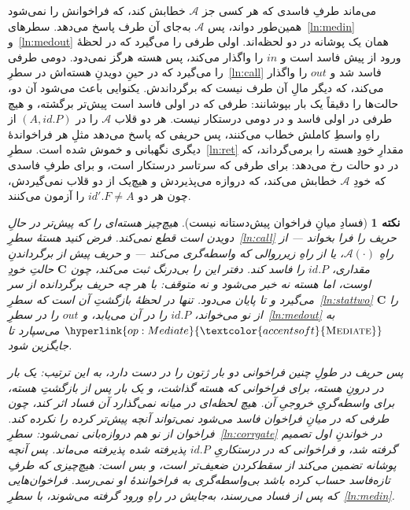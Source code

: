 \documentclass[10pt,oneside,openany]{book}
\newcommand{\Cs}{\mathbf{C}}
\newcommand{\Adv}{\mathcal{A}}
\newcommand{\op}[1]{\textnormal{\textsc{#1}}}
\newcommand{\opl}[1]{\hyperlink{op:#1}{\textcolor{accentsoft}{\op{#1}}}}
\newcommand{\id}{id}
\theoremstyle{accentdef}
\newtheorem{remark}[definition]{نکته}
\theoremstyle{accentplain}
\begin{document}
می‌ماند طرفِ فاسدی که هر کسی جز $\Adv$ خطابش کند، که فراخوانش را نمی‌شود
همین‌طور دواند، پس $\Adv$ به‌جای آن طرف پاسخ می‌دهد.
سطرهای~\ref{ln:medin} و~\ref{ln:medout} همان یک پوشانه در دو لحظه‌اند.
اولی طرفی را می‌گیرد که در لحظهٔ ورود از پیش فاسد است و $in$ را واگذار
می‌کند، پس هسته هرگز نمی‌دود. دومی طرفی را می‌گیرد که در حینِ دویدنِ
هسته‌اش در سطرِ~\ref{ln:call} فاسد شد و $out$ را واگذار می‌کند، که دیگر
مالِ آن طرف نیست که برگرداندش. یکنوایی باعث می‌شود آن دو، حالت‌ها را
دقیقاً یک بار بپوشانند: طرفی که در اولی فاسد است پیش‌تر برگشته، و هیچ طرفی
در اولی فاسد و در دومی درستکار نیست. هر دو قلاب $\Adv$ را در $(A,\id.P)$
از راهِ واسطِ کاملش خطاب می‌کنند، پس حریفی که پاسخ می‌دهد مثلِ هر
فراخواندهٔ دیگری نگهبانی و خموش شده است. سطرِ~\ref{ln:ret} مقدارِ خودِ
هسته را برمی‌گرداند، که در دو حالت رخ می‌دهد: برای طرفی که سرتاسر درستکار
است، و برای طرفِ فاسدی که خودِ $\Adv$ خطابش می‌کند، که دروازه می‌پذیردش و
هیچ‌یک از دو قلاب نمی‌گیردش، چون هر دو $\id'.F \neq A$ را آزمون می‌کنند.

\begin{remark}[فسادِ میانِ فراخوان پیش‌دستانه نیست]\label{rem:midcall}
هیچ‌چیز هسته‌ای را که پیش‌تر در حالِ دویدن است قطع نمی‌کند. فرض کنید
هستهٔ سطرِ~\ref{ln:call} حریف را فرا بخواند --- از راهِ $\Adv(\cdot)$، یا
از راهِ زیرروالی که واسطه‌گری می‌کند --- و حریف پیش از برگرداندنِ مقداری،
$\id.P$ را فاسد کند. دفتر این را بی‌درنگ ثبت می‌کند، چون $\Cs$ حالتِ خودِ
اوست، اما هسته نه خبر می‌شود و نه متوقف: با هر چه حریف برگردانده از سر
می‌گیرد و تا پایان می‌دود. تنها در لحظهٔ بازگشتِ آن است که
سطرِ~\ref{ln:stattwo} $\Cs$ را از نو می‌خواند، $\id.P$ را در آن می‌یابد، و
$out$ را در سطرِ~\ref{ln:medout} به $\opl{Mediate}$ می‌سپارد تا جایگزین
شود.

پس حریف در طولِ چنین فراخوانی دو بار ژتون را در دست دارد، به این ترتیب:
یک بار در درونِ هسته، برای فراخوانی که هسته گذاشت، و یک بار پس از بازگشتِ
هسته، برای واسطه‌گریِ خروجیِ آن. هیچ لحظه‌ای در میانه نمی‌گذارد آن فساد
اثر کند، چون طرفی که در میانِ فراخوان فاسد می‌شود نمی‌تواند آنچه پیش‌تر
کرده را نکرده کند. فراخوان از نو هم دروازه‌بانی نمی‌شود:
سطرِ~\ref{ln:corrgate} در خواندنِ اول تصمیم گرفته شد، و فراخوانی که در
درستکاریِ $\id.P$ پذیرفته شده پذیرفته می‌ماند. پس آنچه پوشانه تضمین
می‌کند از سقط‌کردن ضعیف‌تر است، و بس است: هیچ‌چیزی که طرفِ تازه‌فاسد حساب
کرده باشد بی‌واسطه‌گری به فراخوانندهٔ او نمی‌رسد. فراخوان‌هایی که
\emph{پس از} فساد می‌رسند، به‌جایش در راهِ ورود گرفته می‌شوند، با
سطرِ~\ref{ln:medin}.
\end{remark}

\end{document}
